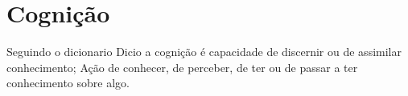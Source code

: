 
\chapter{Cognição}%
\label{cap:aprendizagem}

\begin{definition}[Cognição]
Seguindo o dicionario Dicio \cite{diciocognicao} a cognição é 
capacidade de discernir ou de assimilar conhecimento; 
Ação de conhecer, de perceber, de ter ou de passar a ter conhecimento sobre algo.
\end{definition}











